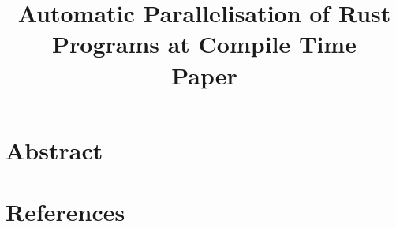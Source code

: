 \documentclass[12pt, a4paper]{article}
\title{
	\vspace{-4ex}
	\LARGE\textbf{Automatic Parallelisation of Rust Programs at Compile Time} \\
	\vspace{1ex}
	\large\textbf{Paper}
	\vspace{-9ex}
}
\date{}
\begin{document}
\maketitle

\section{Abstract}

\section{References}
\printbibliography[heading=none]
\end{document}

